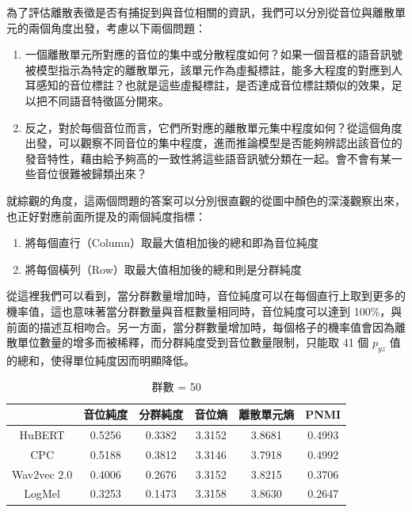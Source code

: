 {        為了評估離散表徵是否有捕捉到與音位相關的資訊，我們可以分別從音位與離散單元的兩個角度出發，考慮以下兩個問題：
\begin{enumerate}
    \item 一個離散單元所對應的音位的集中或分散程度如何？如果一個音框的語音訊號被模型指示為特定的離散單元，該單元作為虛擬標註，能多大程度的對應到人耳感知的音位標註？也就是這些虛擬標註，是否達成音位標註類似的效果，足以把不同語音特徵區分開來。
    \item 反之，對於每個音位而言，它們所對應的離散單元集中程度如何？從這個角度出發，可以觀察不同音位的集中程度，進而推論模型是否能夠辨認出該音位的發音特性，藉由給予夠高的一致性將這些語音訊號分類在一起。會不會有某一些音位很難被歸類出來？
\end{enumerate}

{
        就綜觀的角度，這兩個問題的答案可以分別很直觀的從圖中顏色的深淺觀察出來，也正好對應前面所提及的兩個純度指標：
        \begin{enumerate}
            \item 將每個直行（Column）取最大值相加後的總和即為音位純度
            \item 將每個橫列（Row）取最大值相加後的總和則是分群純度
        \end{enumerate}

        從這裡我們可以看到，當分群數量增加時，音位純度可以在每個直行上取到更多的機率值，這也意味著當分群數量與音框數量相同時，音位純度可以達到 100\%，與前面的描述互相吻合。另一方面，當分群數量增加時，每個格子的機率值會因為離散單位數量的增多而被稀釋，而分群純度受到音位數量限制，只能取 41 個 $p_{yz}$ 值的總和，使得單位純度因而明顯降低。
}

{


\begin{table}[!htbp]
    \centering
    \begin{subtable}[t]{\textwidth}
        \centering
        \begin{tabular}{|c|c|c|c|c|c|} \hline
                        & 音位純度   & 分群純度   & 音位熵    & 離散單元熵  & PNMI   \\ \hline
            HuBERT      &     0.5256 &     0.3382 &    3.3152 &      3.8681 & 0.4993 \\ \hline    %
            CPC         &     0.5188 &     0.3812 &    3.3146 &      3.7918 & 0.4992 \\ \hline    %
            Wav2vec 2.0 &     0.4006 &     0.2676 &    3.3152 &      3.8215 & 0.3706 \\ \hline    %
            LogMel      &     0.3253 &     0.1473 &    3.3158 &      3.8630 & 0.2647 \\ \hline    %
        \end{tabular}
        \caption{群數 = 50}
        \label{tab:ch3-clu050-phn}
    \end{subtable}


\end{table}}}
